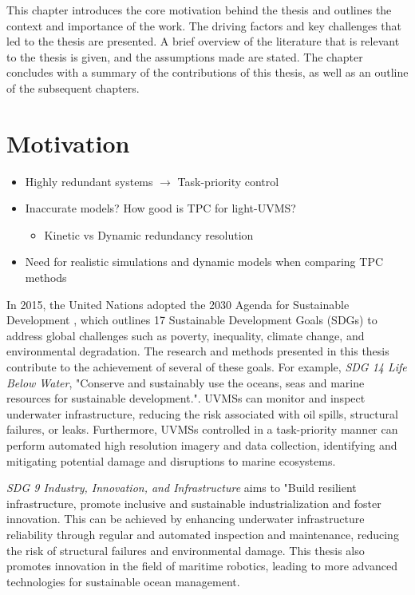 This chapter introduces the core motivation behind the thesis and outlines the
context and importance of the work. The driving factors and key challenges that
led to the thesis are presented. A brief overview of the literature that is
relevant to the thesis is given, and the assumptions made are
stated. The chapter concludes with a summary of the contributions of this thesis,
as well as an outline of the subsequent chapters.


\section{Motivation}

{
    \color{red}
    \begin{itemize}
        \item Highly redundant systems $\rightarrow$ Task-priority control
        \item Inaccurate models? How good is TPC for light-UVMS?
            \begin{itemize}
                \item Kinetic vs Dynamic redundancy resolution
            \end{itemize}
        \item Need for realistic simulations and dynamic models when comparing TPC methods
    \end{itemize}
}

In 2015, the United Nations adopted the 2030 Agenda for Sustainable Development
\cite{UN2030Agenda}, which outlines 17 Sustainable Development Goals (SDGs) to
address global challenges such as poverty, inequality, climate change, and
environmental degradation. The research and methods presented in this thesis
contribute to the achievement of several of these goals. For example, \emph{SDG 14
Life Below Water}, "Conserve and sustainably use the oceans, seas and marine
resources for sustainable development.". UVMSs can monitor and inspect underwater
infrastructure, reducing the risk associated with oil spills, structural failures,
or leaks. Furthermore, UVMSs controlled in a task-priority manner can perform automated
high resolution imagery and data collection, identifying and mitigating potential
damage and disruptions to marine ecosystems.

\emph{SDG 9 Industry, Innovation, and Infrastructure} aims to "Build resilient
infrastructure, promote inclusive and sustainable industrialization and foster
innovation. This can be achieved by enhancing underwater infrastructure reliability
through regular and automated inspection and maintenance, reducing the risk of
structural failures and environmental damage. This thesis also promotes innovation
in the field of maritime robotics, leading to more advanced technologies for
sustainable ocean management.

